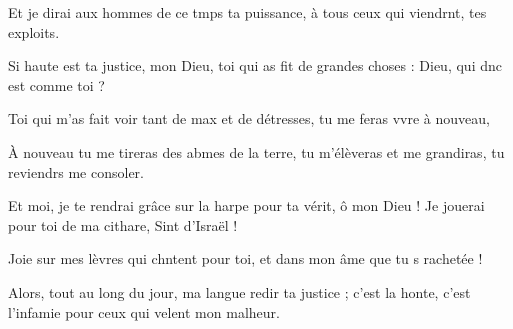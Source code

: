 \item Et je dirai aux hommes de ce tmps ta puissance, à tous ceux qui viendrnt, tes exploits.
\item Si haute est ta justice, mon Dieu, toi qui as fit de grandes choses : Dieu, qui dnc est comme toi ?
\item Toi qui m’as fait voir tant de max et de détresses, tu me feras vvre à nouveau, 
\item À nouveau tu me tireras des abmes de la terre, tu m’élèveras et me grandiras, tu reviendrs me consoler.
\item Et moi, je te rendrai grâce sur la harpe pour ta vérit, ô mon Dieu ! Je jouerai pour toi de ma cithare, Sint d’Israël !
\item Joie sur mes lèvres qui chntent pour toi, et dans mon âme que tu s rachetée !
\item Alors, tout au long du jour, ma langue redir ta justice ; c’est la honte, c’est l’infamie pour ceux qui velent mon malheur.
